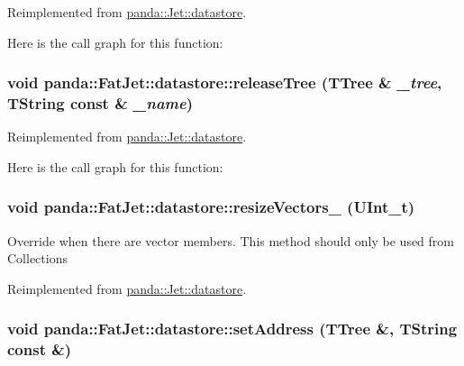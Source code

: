 Reimplemented from \hyperlink{structpanda_1_1Jet_1_1datastore_ac3a9ecd013ec5d5bf94f71ff013e5491}{panda::Jet::datastore}.

Here is the call graph for this function:\hypertarget{structpanda_1_1FatJet_1_1datastore_a8dd1a45fedb7d5ec627601b23f0dc2d5}{
\subsubsection[{releaseTree}]{\setlength{\rightskip}{0pt plus 5cm}void panda::FatJet::datastore::releaseTree (TTree \& {\em \_\-tree}, \/  TString const \& {\em \_\-name})}}
\label{structpanda_1_1FatJet_1_1datastore_a8dd1a45fedb7d5ec627601b23f0dc2d5}


Reimplemented from \hyperlink{structpanda_1_1Jet_1_1datastore_ae6ac289071c894912c7a60cdd224509f}{panda::Jet::datastore}.

Here is the call graph for this function:\hypertarget{structpanda_1_1FatJet_1_1datastore_ac707315048c1fe184534202259fbdda9}{
\subsubsection[{resizeVectors\_\-}]{\setlength{\rightskip}{0pt plus 5cm}void panda::FatJet::datastore::resizeVectors\_\- (UInt\_\-t)}}
\label{structpanda_1_1FatJet_1_1datastore_ac707315048c1fe184534202259fbdda9}


Override when there are vector members. This method should only be used from Collections 

Reimplemented from \hyperlink{structpanda_1_1Jet_1_1datastore_a8de9fbcd55c17f7d3d022088f6ded487}{panda::Jet::datastore}.\hypertarget{structpanda_1_1FatJet_1_1datastore_a0064ba6151edcef6eb9d4c5b6a9fdcf7}{
\subsubsection[{setAddress}]{\setlength{\rightskip}{0pt plus 5cm}void panda::FatJet::datastore::setAddress (TTree \&, \/  TString const \&)}}
\label{structpanda_1_1FatJet_1_1datastore_a0064ba6151edcef6eb9d4c5b6a9fdcf7}


